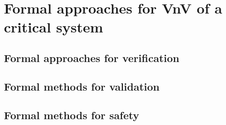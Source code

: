
\section{Formal approaches for VnV of a critical system}

\begin{comment}
This section will describe how formal methods are involved in the VnV of critical system in particular how they ensure the proof of safety properties.
\end{comment}

\subsection{Formal approaches for verification}

\begin{comment}
completitude, consistence,  static checking, type checking,...
\end{comment}


\subsection{Formal methods for validation}

\begin{comment}
automatic test generation, simulation or animation, low level model validation against unit test activities,...
\end{comment}

\subsection{Formal methods for safety}

\begin{comment}
proof of safety requirements, static analysis, safety analysis, traceability,...
\end{comment}




